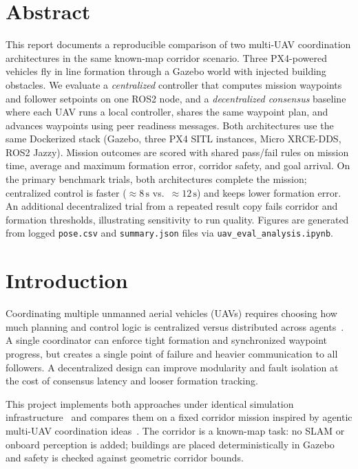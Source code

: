 \documentclass[a4paper,11pt]{article}
\begin{document}
\pagestyle{plain}

\section*{Abstract}

This report documents a reproducible comparison of two multi-UAV coordination architectures in the same known-map corridor scenario. Three PX4-powered vehicles fly in line formation through a Gazebo world with injected building obstacles. We evaluate a \emph{centralized} controller that computes mission waypoints and follower setpoints on one ROS2 node, and a \emph{decentralized consensus} baseline where each UAV runs a local controller, shares the same waypoint plan, and advances waypoints using peer readiness messages. Both architectures use the same Dockerized stack (Gazebo, three PX4 SITL instances, Micro XRCE-DDS, ROS2 Jazzy). Mission outcomes are scored with shared pass/fail rules on mission time, average and maximum formation error, corridor safety, and goal arrival. On the primary benchmark trials, both architectures complete the mission; centralized control is faster ($\approx 8\,\mathrm{s}$ vs.\ $\approx 12\,\mathrm{s}$) and keeps lower formation error. An additional decentralized trial from a repeated result copy fails corridor and formation thresholds, illustrating sensitivity to run quality. Figures are generated from logged \texttt{pose.csv} and \texttt{summary.json} files via \texttt{uav\_eval\_analysis.ipynb}.

\section{Introduction}

Coordinating multiple unmanned aerial vehicles (UAVs) requires choosing how much planning and control logic is centralized versus distributed across agents~\cite{beard2008uav}. A single coordinator can enforce tight formation and synchronized waypoint progress, but creates a single point of failure and heavier communication to all followers. A decentralized design can improve modularity and fault isolation at the cost of consensus latency and looser formation tracking.

This project implements both approaches under identical simulation infrastructure~\cite{px42024,ros2jazzy2024} and compares them on a fixed corridor mission inspired by agentic multi-UAV coordination ideas~\cite{uavproject2026}. The corridor is a known-map task: no SLAM or onboard perception is added; buildings are placed deterministically in Gazebo and safety is checked against geometric corridor bounds.
\end{document}
